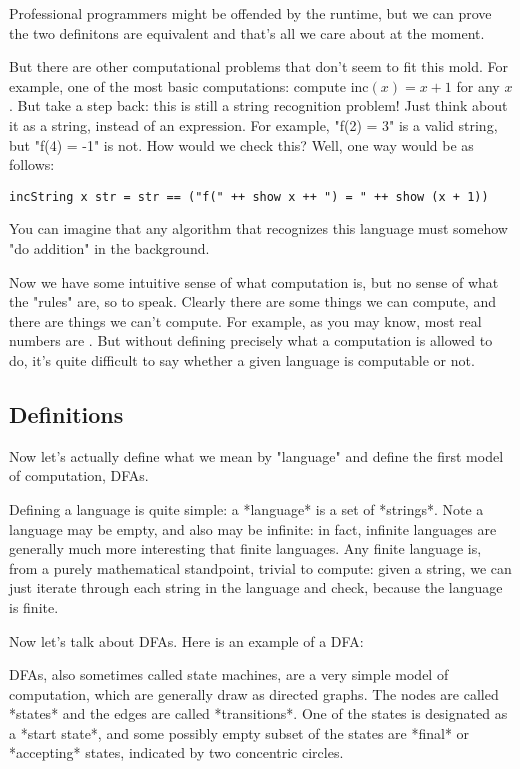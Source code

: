 Professional programmers might be offended by the runtime, but we can prove the two definitons are equivalent and that's all we care about at the moment.

But there are other computational problems that don't seem to fit this mold.
For example, one of the most basic computations: compute $\text{inc}(x) = x + 1$ for any $x$.
But take a step back: this is still a string recognition problem!
Just think about it as a string, instead of an expression.
For example, "f(2) = 3" is a valid string, but "f(4) = -1" is not.
How would we check this?
Well, one way would be as follows:

\begin{verbatim}
incString x str = str == ("f(" ++ show x ++ ") = " ++ show (x + 1))
\end{verbatim}

You can imagine that any algorithm that recognizes this language must somehow "do addition" in the background.

Now we have some intuitive sense of what computation is, but no sense of what the "rules" are, so to speak.
Clearly there are some things we can compute, and there are things we can't compute.
For example, as you may know, most real numbers are .
But without defining precisely what a computation is allowed to do, it's quite difficult to say whether a given language is computable or not.

\subsection{Definitions}

Now let's actually define what we mean by "language" and define the first model of computation, DFAs.

Defining a language is quite simple: a *language* is a set of *strings*.
Note a language may be empty, and also may be infinite: in fact, infinite languages are generally much more interesting that finite languages.
Any finite language is, from a purely mathematical standpoint, trivial to compute: given a string, we can just iterate through each string in the language and check, because the language is finite.

Now let's talk about DFAs.
Here is an example of a DFA:


DFAs, also sometimes called state machines, are a very simple model of computation, which are generally draw as directed graphs.
The nodes are called *states* and the edges are called *transitions*.
One of the states is designated as a *start state*, and some possibly empty subset of the states are *final* or *accepting* states, indicated by two concentric circles.

